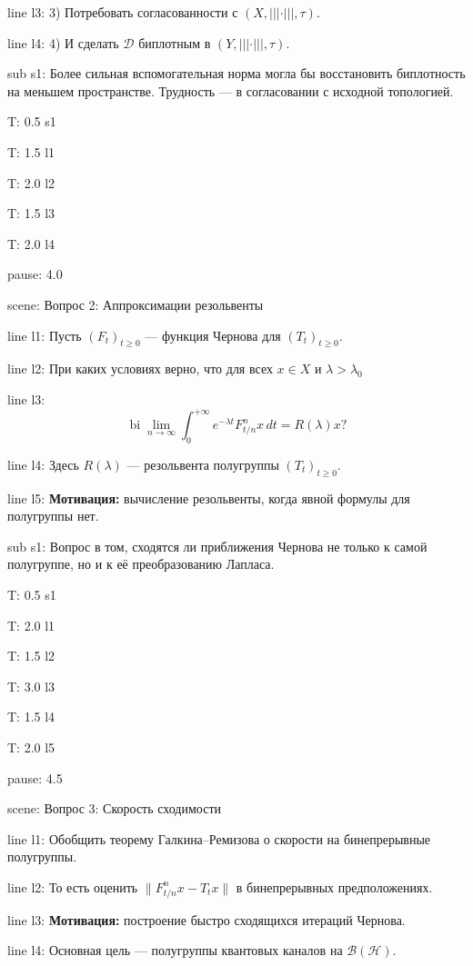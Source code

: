 \documentclass[a4paper,11pt]{article}
\newcommand{\Hilb}{\mathcal{H}}
\begin{document}
line l3: {3) Потребовать согласованности с $(X,|||\cdot|||,\tau)$.}

line l4: {4) И сделать $\mathcal{D}$ биплотным в $(Y,|||\cdot|||,\tau)$.}


sub s1: {Более сильная вспомогательная норма могла бы восстановить биплотность на меньшем пространстве. Трудность --- в согласовании с исходной топологией.}


T: 0.5 s1

T: 1.5 l1

T: 2.0 l2

T: 1.5 l3

T: 2.0 l4

pause: 4.0



scene: {Вопрос 2: Аппроксимации резольвенты}

line l1: {Пусть $(F_t)_{t\ge0}$ --- функция Чернова для $(T_t)_{t\ge0}$.}

line l2: {При каких условиях верно, что для всех $x\in X$ и $\lambda>\lambda_0$}

line l3: {$$\operatorname{bi}\lim\limits_{n\to\infty}\int_0^{+\infty}e^{-\lambda t}F_{t/n}^n x\,dt=R(\lambda)x?$$}

line l4: {Здесь $R(\lambda)$ --- резольвента полугруппы $(T_t)_{t\ge0}$.}

line l5: {\textbf{Мотивация:} вычисление резольвенты, когда явной формулы для полугруппы нет.}


sub s1: {Вопрос в том, сходятся ли приближения Чернова не только к самой полугруппе, но и к её преобразованию Лапласа.}


T: 0.5 s1

T: 2.0 l1

T: 1.5 l2

T: 3.0 l3

T: 1.5 l4

T: 2.0 l5

pause: 4.5



scene: {Вопрос 3: Скорость сходимости}

line l1: {Обобщить теорему Галкина--Ремизова о скорости на бинепрерывные полугруппы.}

line l2: {То есть оценить $\|F_{t/n}^n x-T_t x\|$ в бинепрерывных предположениях.}

line l3: {\textbf{Мотивация:} построение быстро сходящихся итераций Чернова.}

line l4: {Основная цель --- полугруппы квантовых каналов на $\mathcal{B}(\Hilb)$.}
\end{document}
